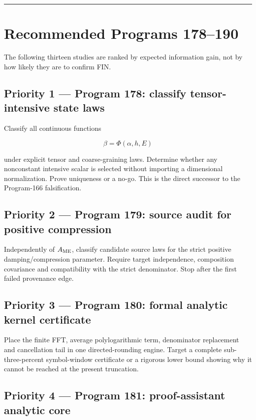 \documentclass[11pt,a4paper,openany]{report}
\begin{document}
\par\medskip\hrule\medskip

\chapter{Recommended Programs 178--190}

The following thirteen studies are ranked by expected information gain, not by how likely they are to confirm FIN.

\section{Priority 1 --- Program 178: classify tensor-intensive state laws}

Classify all continuous functions

\[
\beta=\Phi(\alpha,h,E)
\]

under explicit tensor and coarse-graining laws. Determine whether any nonconstant intensive scalar is selected without importing a dimensional normalization. Prove uniqueness or a no-go. This is the direct successor to the Program-166 falsification.

\section{Priority 2 --- Program 179: source audit for positive compression}

Independently of \(A_{\rm ME}\), classify candidate source laws for the strict positive damping/\allowbreak{}compression parameter. Require target independence, composition covariance and compatibility with the strict denominator. Stop after the first failed provenance edge.

\section{Priority 3 --- Program 180: formal analytic kernel certificate}

Place the finite FFT, average polylogarithmic term, denominator replacement and cancellation tail in one directed-rounding engine. Target a complete sub-three-percent symbol-window certificate or a rigorous lower bound showing why it cannot be reached at the present truncation.

\section{Priority 4 --- Program 181: proof-assistant analytic core}
\end{document}
